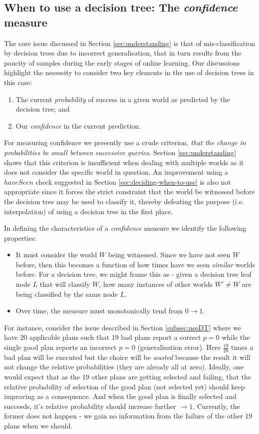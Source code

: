 \documentclass[a4paper]{article}
\newcommand{\dt}{{decision tree}\xspace}
\begin{document}
\subsection{When to use a \dt: The \textit{confidence} measure}
\label{subsec:confidence}
The core issue discussed in Section \ref{sec:understanding} is that of mis-classification by {\dt}s due to incorrect generalisation, that in turn results from the paucity of samples during the early stages of online learning. Our discussions highlight the necessity to consider two key elements in the use of {\dt}s in this case:

\begin{enumerate}
\item The current \textit{probability} of success in a given world as predicted by the \dt; and
\item Our \textit{confidence} in the current prediction.
\end{enumerate}

For measuring confidence we presently use a crude criterion, \textit{that the change in probabilities be small between successive queries}. Section \ref{sec:understanding} shows that this criterion is insufficient when dealing with multiple worlds as it does not consider the specific world in question. An improvement using a $haveSeen$ check suggested in Section \ref{sec:deciding-when-to-use} is also not appropriate since it forces the strict constraint that the world be witnessed before the \dt may be used to classify it, thereby defeating the purpose (i.e. interpolation) of using a \dt in the first place. 

In defining the characteristics of a \textit{confidence} measure we identify the following properties:
\begin{itemize}
\item It must consider the world $W$ being witnessed. Since we have not seen $W$ before, then this becomes a function of how times have we seen \textit{similar} worlds before. For a \dt, we might frame this as - given a \dt leaf node $L$ that will classify $W$, how many instances of other worlds $W' \neq W$ are being classified by the same node $L$.
\item Over time, the measure must monotonically tend from $0 \to 1$.
\end{itemize}

For instance, consider the issue described in Section \ref{subsec:useDT} where we have $20$ applicable plans such that $19$ bad plans report a correct $p=0$ while the single good plan reports an incorrect $p=0$ (generalisation error). Here $\frac{19}{20}$ times a bad plan will be executed but the choice will be \textit{wasted} because the result it will not change the relative probabilities (they are already all at zero). Ideally, one would expect that as the $19$ other plans are getting selected and failing, that the relative probability of selection of the good plan (not selected yet) should keep improving as a consequence. And when the good plan is finally selected and succeeds, it's relative probability should increase further $\to 1$. Currently, the former does not happen - we gain no information from the failure of the other $19$ plans when we should.
\end{document}
